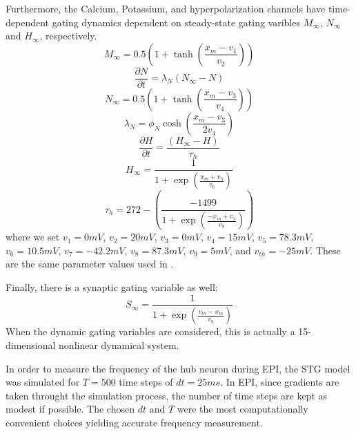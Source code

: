\documentclass[11pt]{article}
\begin{document}
Furthermore, the Calcium, Potassium, and hyperpolarization channels have time-dependent gating dynamics dependent on steady-state gating varibles $M_\infty$, $N_\infty$ and $H_\infty$, respectively.
\begin{equation}  M_{\infty} = 0.5 \left( 1 + \tanh \left( \frac{x_m - v_1}{v_2} \right) \right) \end{equation}
\begin{equation}  \frac{\partial N}{\partial t} = \lambda_N (N_\infty - N)  \end{equation}
\begin{equation}  N_\infty = 0.5 \left( 1 + \tanh \left( \frac{x_m - v_3}{v_4} \right) \right) \end{equation}
\begin{equation}  \lambda_N = \phi_N \cosh \left( \frac{x_m - v_3}{2 v_4} \right) \end{equation}
\begin{equation}  \frac{\partial H}{\partial t} = \frac{\left( H_\infty - H \right)}{\tau_h} \end{equation}
\begin{equation}  H_\infty = \frac{1}{1 + \exp \left( \frac{x_m + v_5}{v_6} \right)} \end{equation}
\begin{equation}  \tau_h = 272 - \left( \frac{-1499}{1 + \exp \left( \frac{-x_m + v_7}{v_8} \right)} \right) \end{equation}
where we set $v_1 = 0mV$, $v_2  = 20mV$, $v_3 = 0mV$, $v_4 = 15mV$, $v_5 = 78.3mV$,
$v_6 = 10.5mV$, $v_7 = -42.2mV$, $v_8 = 87.3mV$, $v_9 = 5mV$, and $v_{th} = -25mV$.  These are the same parameter values used in \cite{gutierrez2013multiple}.

Finally, there is a synaptic gating variable as well:
\begin{equation} S_\infty = \frac{1}{1 + \exp \left( \frac{v_{th} - x_m}{v_9} \right)} 
\end{equation}
When the dynamic gating variables are considered, this is actually a 15-dimensional nonlinear dynamical system.

In order to measure the frequency of the hub neuron during EPI, the STG model was simulated for $T = 500$ time steps of $dt = 25ms$.  In EPI, since gradients are taken throught the simulation process, the number of time steps are kept as modest if possible. The chosen $dt$ and $T$ were the most computationally convenient choices yielding accurate frequency measurement.
\end{document}

